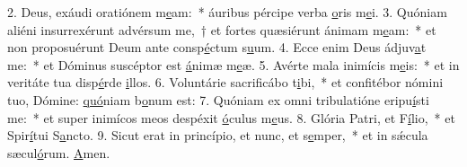 2. Deus, exáudi oratiónem m\uline{e}am:~* áuribus pércipe verba \uline{o}ris m\uline{e}i.
3. Quóniam aliéni insurrexérunt advérsum me,~† et fortes quæsiérunt ánimam m\uline{e}am:~* et non proposuérunt Deum ante consp\uline{é}ctum s\uline{u}um.
4. Ecce enim Deus ádjuv\uline{a}t me:~* et Dóminus suscéptor est \uline{á}nimæ m\uline{e}æ.
5. Avérte mala inimícis m\uline{e}is:~* et in veritáte tua disp\uline{é}rde \uline{i}llos.
6. Voluntárie sacrificábo t\uline{i}bi,~* et confitébor nómini tuo, Dómine: \uline{quó}niam b\uline{o}num est:
7. Quóniam ex omni tribulatióne eripu\uline{í}sti me:~* et super inimícos meos despéxit \uline{ó}culus m\uline{e}us.
8. Glória Patri, et F\uline{í}lio,~* et Spir\uline{í}tui S\uline{a}ncto.
9. Sicut erat in princípio, et nunc, et s\uline{e}mper,~* et in sǽcula sæcul\uline{ó}rum. \uline{A}men.
